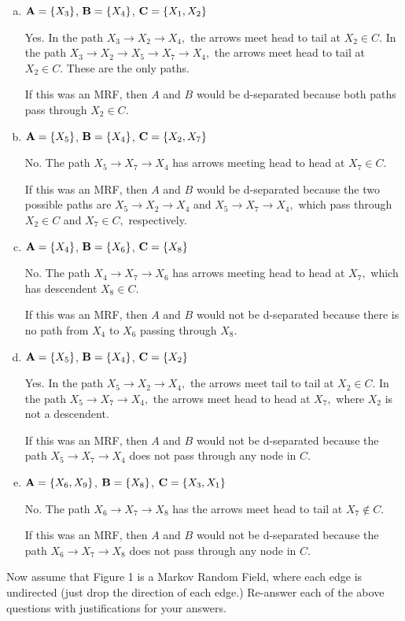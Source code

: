 \documentclass{article}
\begin{document}
\begin{enumerate}[a.]
	\item ${\bf A} = \{ X_3 \}$, ${\bf B} = \{ X_4 \}$, ${\bf C} = \{X_1,X_2\}$
		\begin{answer*}
			Yes. In the path $X_3\to X_2\to X_4,$ the arrows meet head to tail at $X_2\in C.$ In the path $X_3\to X_2\to X_5\to X_7\to X_4,$ the arrows meet head to tail at $X_2\in C.$ These are the only paths.

			If this was an MRF, then $A$ and $B$ would be d-separated because both paths pass through $X_2\in C.$
		\end{answer*}

	\item ${\bf A} = \{ X_5 \}$, ${\bf B} = \{X_4\}$, ${\bf C} = \{X_2,X_7\}$
		\begin{answer*}
			No. The path $X_5\to X_7\to X_4$ has arrows meeting head to head at $X_7\in C.$

			If this was an MRF, then $A$ and $B$ would be d-separated because the two possible paths are $X_5\to X_2\to X_4$ and $X_5\to X_7\to X_4,$ which pass through $X_2\in C$ and $X_7\in C,$ respectively.
		\end{answer*}

	\item ${\bf A} = \{X_4\}$, ${\bf B} = \{X_6\}$, ${\bf C} = \{X_8\}$
		\begin{answer*}
			No. The path $X_4\to X_7\to X_6$ has arrows meeting head to head at $X_7,$ which has descendent $X_8\in C.$

			If this was an MRF, then $A$ and $B$ would not be d-separated because there is no path from $X_4$ to $X_6$ passing through $X_8.$
		\end{answer*}

	\item ${\bf A} = \{X_5\}$, ${\bf B} = \{X_4\}$, ${\bf C} = \{X_2\}$
		\begin{answer*}
			Yes. In the path $X_5\to X_2\to X_4,$ the arrows meet tail to tail at $X_2\in C.$ In the path $X_5\to X_7\to X_4,$ the arrows meet head to head at $X_7,$ where $X_2$ is not a descendent.

			If this was an MRF, then $A$ and $B$ would not be d-separated because the path $X_5\to X_7\to X_4$ does not pass through any node in $C.$
		\end{answer*}

	\item ${\bf A} = \{X_6, X_9\}$, ${\bf B} = \{X_8\}$, ${\bf C} = \{X_3,X_1\}$
		\begin{answer*}
			No. The path $X_6\to X_7\to X_8$ has the arrows meet head to tail at $X_7\not\in C.$

			If this was an MRF, then $A$ and $B$ would not be d-separated because the path $X_6\to X_7\to X_8$ does not pass through any node in $C.$
		\end{answer*}
\end{enumerate}
Now assume that Figure 1 is a Markov Random Field, where each edge is undirected (just drop the direction of each edge.) Re-answer each of the above questions with justifications for your answers.
\end{document}
